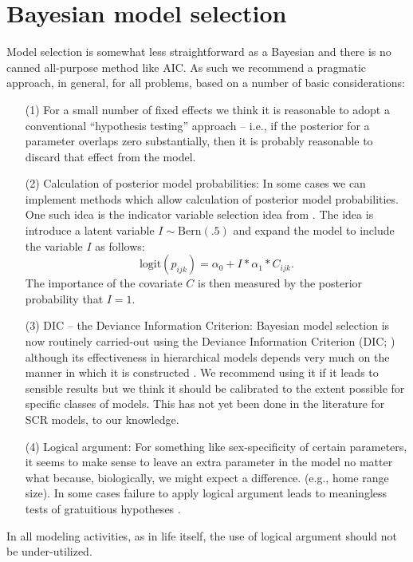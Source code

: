 \section{Bayesian model selection}

Model selection is somewhat less straightforward as a Bayesian and
there is no canned all-purpose method like AIC. As such we
recommend a pragmatic approach, in general, for all problems,
based on a number of basic considerations:
\begin{itemize}
\item[(1)] For a small number of fixed effects we think it is
  reasonable to adopt a conventional ``hypothesis testing'' approach
  -- i.e., if the posterior for a parameter overlaps zero
  substantially, then it is probably reasonable to discard that
  effect from the model.
\item[(2)] Calculation of posterior model probabilities: In some cases
  we can implement methods which allow calculation of posterior model
  probabilities. One such idea is the indicator variable selection
  idea from \citet{kuo_mallick:1998}.  The idea is introduce a latent
  variable $I \sim \mbox{Bern}(.5)$ and expand the model to include
  the variable $I$ as follows:
\[
 \mbox{logit}(p_{ijk}) = \alpha_{0} + I*\alpha_{1}*C_{ijk}.
\]
The importance of the covariate $C$ is then measured by the posterior
probability that $I=1$.
\item[(3)] DIC -- the Deviance Information Criterion: Bayesian model
  selection is now routinely carried-out using the Deviance
  Information Criterion (DIC; \citet{speigelhalter_etal:2002})
  although its
  effectiveness in hierarchical models depends very much on the manner
  in which it is constructed \citep{millar:2009}.  We recommend using
  it if it leads to sensible results but we think it should be
  calibrated to the extent possible for specific classes of models.
  This has not yet been done in the literature for SCR models, to our knowledge.
\item[(4)] Logical argument: For something like sex-specificity of
  certain parameters, it seems to make sense to leave an extra
  parameter in the model no matter what because, biologically, we might
 expect a difference. (e.g., home range size). 
In some cases failure to apply logical argument leads to
  meaningless tests of gratuitious hypotheses \citep{johnson:1999}.
\end{itemize}
In all modeling activities, as in life itself, the use of logical argument should not be under-utilized.

